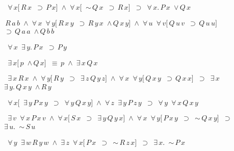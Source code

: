 \begin{description} 

\item[\parbox{\textwidth}{X2106\index{X2106@X2106, {\bf Theorem}} }] \texttt{$ $ $\forall \,x [ \,R \,x $ $\supset \,P \,x ] $ $\land $ $\forall \,x [ $ $\sim \,Q \,x $ $\supset \,R \,x ] $ $\supset $ $\forall \,x . \,P \,x $ $\lor \,Q \,x$}


\item[\parbox{\textwidth}{X2107\index{X2107@X2107, {\bf Theorem}} }] \texttt{$ \,R \,a \,b $ $\land $ $\forall \,x $ $\forall \,y [ \,R \,x \,y $ $\supset \,R \,y \,x $ $\land \,Q \,x \,y ] $ $\land $ $\forall \,u $ $\forall \,v [ \,Q \,u \,v $ $\supset \,Q \,u \,u ] $ $\supset \,Q \,a \,a $ $\land \,Q \,b \,b$}


\item[\parbox{\textwidth}{X2108\index{X2108@X2108, {\bf Theorem}} }] \texttt{$ $ $\forall \,x $ $\exists \,y . \,P \,x $ $\supset \,P \,y$}


\item[\parbox{\textwidth}{X2109\index{X2109@X2109, {\bf Theorem}} }] \texttt{$ $ $\exists \,x [ \,p $ $\land \,Q \,x ] $ $\equiv \,p $ $\land $ $\exists \,x \,Q \,x$}


\item[\parbox{\textwidth}{X2110\index{X2110@X2110, {\bf Theorem}} }] \texttt{$ $ $\exists \,x \,R \,x $ $\land $ $\forall \,y [ \,R \,y $ $\supset $ $\exists \,z \,Q \,y \,z ] $ $\land $ $\forall \,x $ $\forall \,y [ \,Q \,x \,y $ $\supset \,Q \,x \,x ] $ $\supset $ $\exists \,x $ $\exists \,y . \,Q \,x \,y $ $\land \,R \,y$}


\item[\parbox{\textwidth}{X2111\index{X2111@X2111, {\bf Theorem}} }] \texttt{$ $ $\forall \,x [ $ $\exists \,y \,P \,x \,y $ $\supset $ $\forall \,y \,Q \,x \,y ] $ $\land $ $\forall \,z $ $\exists \,y \,P \,z \,y $ $\supset $ $\forall \,y $ $\forall \,x \,Q \,x \,y$}


\item[\parbox{\textwidth}{X2112\index{X2112@X2112, {\bf Theorem}} }] \texttt{$ $ $\exists \,v $ $\forall \,x \,P \,x \,v $ $\land $ $\forall \,x [ \,S \,x $ $\supset $ $\exists \,y \,Q \,y \,x ] $ $\land $ $\forall \,x $ $\forall \,y [ \,P \,x \,y $ $\supset $ $\sim \,Q \,x \,y ] $ $\supset $ $\exists \,u . $ $\sim \,S \,u$}


\item[\parbox{\textwidth}{X2113\index{X2113@X2113, {\bf Theorem}} }] \texttt{$ $ $\forall \,y $ $\exists \,w \,R \,y \,w $ $\land $ $\exists \,z $ $\forall \,x [ \,P \,x $ $\supset $ $\sim \,R \,z \,x ] $ $\supset $ $\exists \,x . $ $\sim \,P \,x$}



\end{description}
